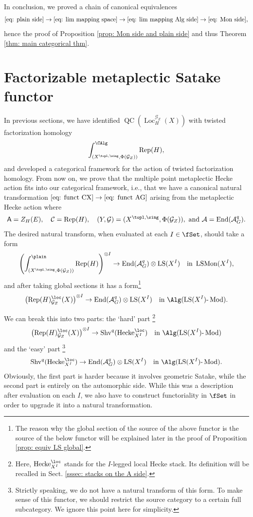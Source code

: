\documentclass[10pt]{amsart}
\theoremstyle{remark}
\newcommand{\te}{\text}
\newcommand{\on}{\operatorname}
\newcommand{\cA}{\mathcal{A}}
\newcommand{\cC}{\mathcal{C}}
\newcommand{\cG}{\mathcal{G}}
\newcommand{\LSMon}{\on{LSMon}}
\newcommand{\lMod}{\text{-}\on{Mod}}
\newcommand{\Rep}{\on{Rep}}
\newcommand{\QC}{\on{QC}}
\newcommand{\Shv}{\on{Shv}}
\newcommand{\Loc}{\on{Loc}}
\newcommand{\LS}{\on{LS}}
\DeclareMathOperator{\End}{End}
\newcommand{\Hecke}{\on{Hecke}}
\newcommand{\sfA}{\mathsf{A}}
\begin{document}
In conclusion, we proved a chain of canonical equivalences
\[\eqref{eq: plain side} \rightarrow \eqref{eq: lim mapping space}\rightarrow \eqref{eq: lim mapping Alg side} \rightarrow \eqref{eq: Mon side},\]
hence the proof of Proposition \ref{prop: Mon side and plain side} and thus Theorem \ref{thm: main categorical thm}.

\section{Factorizable metaplectic Satake functor}\label{sec: metaplectic Satake functor}
In previous sections, we have identified $\QC(\Loc^{\cG_Z}_H(X))$ with twisted factorization homology \[\int^{\CAlg}_{(X^{\topl,\sing},\Phi(\cG_Z))}\Rep(H),\] and developed a categorical framework for the action of twisted factorization homology. From now on, we prove that the multiple point metaplectic Hecke action fits into our categorical framework, i.e., that we have a canonical natural transformation $\eqref{eq: funct CX}\rightarrow \eqref{eq: funct AG}$ arising from the metaplectic Hecke action where 
\[\sfA=Z_H(E),\quad \cC=\Rep(H),\quad  (Y,\cG)=(X^{\topl,\sing},\Phi(\cG_Z)), \te{ and } \cA=\End(\cA^q_G).\]
The desired natural transform, when evaluated at each $I\in\fSet$, should take a form
\[\left(\int^{\plain}_{(X^{\topl,\sing},\Phi(\cG_Z))}\Rep(H)\right)^{\otimes I}\rightarrow \End(\cA^q_G)\otimes \LS(X^I) \quad \te{in }\LSMon(X^I),\]
and after taking global sections it has a form\footnote{The reason why the global section of the source of the above functor is the source of the below functor will be explained later in the proof of Proposition \ref{prop: equiv LS global}.}
\[\left(\Rep(H)^{\loc}_{\cG_Z}(X)\right)^{\otimes I}\rightarrow\End(\cA^q_G)\otimes \LS(X^I) \quad\te{in }\Alg(\LS(X^I)\lMod).\]

We can break this into two parts: the `hard' part \footnote{Here, $\Hecke^{\loc}_{X^I}$ stands for the $I$-legged local Hecke stack. Its definition will be recalled in Sect. \ref{sssec: stacks on the A side}.}
\[\left(\Rep(H)^{\loc}_{\cG_Z}(X)\right)^{\otimes I}\rightarrow \Shv^q(\Hecke^{\loc}_{X^I})\quad \te{in }\Alg(\LS(X^I)\lMod)\]
and the `easy' part \footnote{Strictly speaking, we do not have a natural transform of this form. To make sense of this functor, we should restrict the source category to a certain full subcategory. We ignore this point here for simplicity.}
\[\Shv^q(\Hecke^{\loc}_{X^I})\rightarrow \End(\cA^q_G)\otimes \LS(X^I) \quad \te{in }\Alg(\LS(X^I)\lMod).\]
Obviously, the first part is harder because it involves geometric Satake, while the second part is entirely on the automorphic side. While this was a description after evaluation on each $I$, we also have to construct functoriality in $\fSet$ in order to upgrade it into a natural transformation.
\medskip
\end{document}

